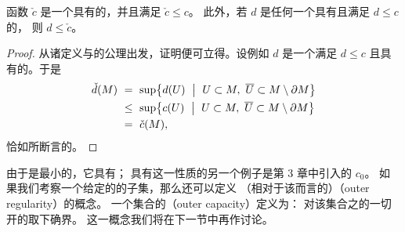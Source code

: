 \begin{proposition}\label{prop:inner-capacity}
函数 $\check{c}$ 是一个具有\trInnerRegularity{}的\trCapacity，并且满足 $\check{c}\leq c$。%
此外，若 $d$ 是任何一个具有\trInnerRegularity{}且满足 $d\leq c$ 的\trCapacity，%
则 $d\leq\check{c}$。
\end{proposition}

\begin{proof}
从诸定义与\trCapacity{}的公理出发，证明便可立得。设例如 $d$ 是一个满足%
$d\leq c$ 且具有\trInnerRegularity{}的\trSymplecticCapacity。于是
\[
\begin{aligned}
\check{d}(M)\ &=\ \sup\bigl\{d(U)\ \bigm|\ U\subset M,\ %
\overline{U}\subset M\setminus\partial M\bigr\}\\
&\leq\ \sup\bigl\{c(U)\ \bigm|\ U\subset M,\ %
\overline{U}\subset M\setminus\partial M\bigr\}\\
&=\ \check{c}(M),
\end{aligned}
\]
恰如所断言的。
\end{proof}

由于\trGromovWidth{}是最小的\trCapacity，它具有\trInnerRegularity；%
具有这一性质的另一个例子是第 3 章中引入的\trCapacity{} $c_{0}$。%
如果我们考察一个给定的\trManifold{}的子集，那么还可以定义%
（相对于该\trManifold{}而言的）\textbf{\trOuterRegularity}（outer regularity）的概念。%
一个集合的\textbf{\trOuterCapacity}（outer capacity）定义为：%
对该集合之\trClosure{}的一切开\trNeighborhood{}的\trCapacity{}取下确界。%
这一概念我们将在下一节中再作讨论。
